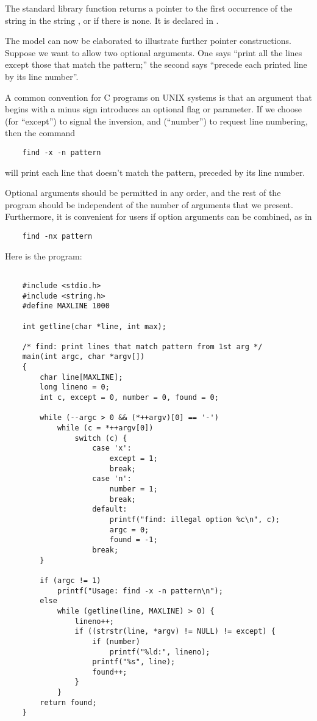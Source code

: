 The standard library function  returns a pointer to the first occurrence of the string  in the string , or  if there is none. It is declared in .

The model can now be elaborated to illustrate further pointer constructions.
Suppose we want to allow two optional arguments.
One says ``print all the lines except those that match the pattern;'' the second says ``precede each printed line by its line number''.

A common convention for C programs on UNIX systems is that an argument that begins with a minus sign introduces an optional flag or parameter.
If we choose  (for ``except'') to signal the inversion, and  (``number'') to request line numbering, then the command
\begin{lstlisting}
    find -x -n pattern
\end{lstlisting}
will print each line that doesn't match the pattern, preceded by its line number.

Optional arguments should be permitted in any order, and the rest of the program should be independent of the number of arguments that we present.
Furthermore, it is convenient for users if option arguments can be combined, as in
\begin{lstlisting}
    find -nx pattern
\end{lstlisting}
Here is the program:
\begin{lstlisting}

    #include <stdio.h>
    #include <string.h>
    #define MAXLINE 1000

    int getline(char *line, int max);

    /* find: print lines that match pattern from 1st arg */
    main(int argc, char *argv[])
    {
        char line[MAXLINE];
        long lineno = 0;
        int c, except = 0, number = 0, found = 0;

        while (--argc > 0 && (*++argv)[0] == '-')
            while (c = *++argv[0])
                switch (c) {
                    case 'x':
                        except = 1;
                        break;
                    case 'n':
                        number = 1;
                        break;
                    default:
                        printf("find: illegal option %c\n", c);
                        argc = 0;
                        found = -1;
                    break;
        }

        if (argc != 1)
            printf("Usage: find -x -n pattern\n");
        else
            while (getline(line, MAXLINE) > 0) {
                lineno++;
                if ((strstr(line, *argv) != NULL) != except) {
                    if (number)
                        printf("%ld:", lineno);
                    printf("%s", line);
                    found++;
                }
            }
        return found;
    }

\end{lstlisting}

